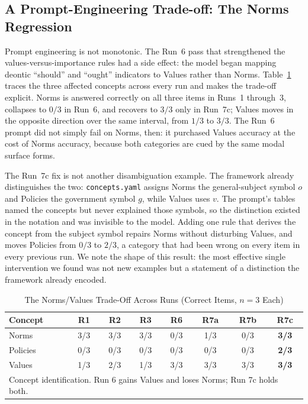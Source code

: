 \documentclass[onecolumn, 11pt]{IEEEtran}
\begin{document}
\subsection{A Prompt-Engineering Trade-off: The Norms Regression}
Prompt engineering is not monotonic. The Run~6 pass that strengthened the values-versus-importance rules had a side effect: the model began mapping deontic ``should'' and ``ought'' indicators to Values rather than Norms. Table~\ref{tab:norms} traces the three affected concepts across every run and makes the trade-off explicit. Norms is answered correctly on all three items in Runs~1 through~3, collapses to $0/3$ in Run~6, and recovers to $3/3$ only in Run~7c; Values moves in the opposite direction over the same interval, from $1/3$ to $3/3$. The Run~6 prompt did not simply fail on Norms, then: it purchased Values accuracy at the cost of Norms accuracy, because both categories are cued by the same modal surface forms.

The Run~7c fix is not another disambiguation example. The framework already distinguishes the two: \texttt{concepts.yaml} assigns Norms the general-subject symbol $o$ and Policies the government symbol $g$, while Values uses $v$. The prompt's tables named the concepts but never explained those symbols, so the distinction existed in the notation and was invisible to the model. Adding one rule that derives the concept from the subject symbol repairs Norms without disturbing Values, and moves Policies from $0/3$ to $2/3$, a category that had been wrong on every item in every previous run. We note the shape of this result: the most effective single intervention we found was not new examples but a statement of a distinction the framework already encoded.

\begin{table}[t]
\caption{The Norms/Values Trade-Off Across Runs (Correct Items, $n{=}3$ Each)}
\label{tab:norms}
\centering
\footnotesize
\begin{tabular}{l c c c c c c c}
\hline
\textbf{Concept} & \textbf{R1} & \textbf{R2} & \textbf{R3} & \textbf{R6} & \textbf{R7a} & \textbf{R7b} & \textbf{R7c} \\
\hline
Norms & 3/3 & 3/3 & 3/3 & 0/3 & 1/3 & 0/3 & \textbf{3/3} \\
Policies & 0/3 & 0/3 & 0/3 & 0/3 & 0/3 & 0/3 & \textbf{2/3} \\
Values & 1/3 & 2/3 & 1/3 & 3/3 & 3/3 & 3/3 & \textbf{3/3} \\
\hline
\multicolumn{8}{l}{\scriptsize Concept identification. Run 6 gains Values and loses Norms; Run 7c holds both.}
\end{tabular}
\end{table}
\end{document}
